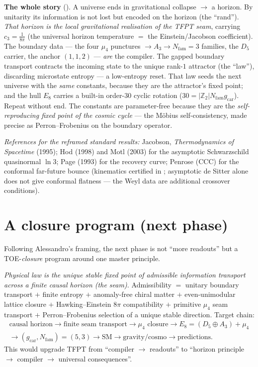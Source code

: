 \documentclass[11pt,a4paper]{article}
\newcommand{\cthree}{c_3}
\newcommand{\gcar}{g_{\mathrm{car}}}
\newcommand{\Nfam}{N_{\mathrm{fam}}}
\newcommand{\Z}{\mathbb Z}
\begin{document}
\par\smallskip\noindent\textbf{The whole story} (\mC).
A universe ends in gravitational collapse $\to$ a horizon. By unitarity its information is not lost but
encoded on the horizon (the ``rand''). \emph{That horizon is the local gravitational realisation of the
TFPT seam}, carrying $\cthree=\tfrac1{8\pi}$ (the universal horizon temperature $=$ the Einstein/Jacobson
coefficient). The boundary data --- the four
$\mu_4$ punctures $\to A_3\to\Nfam{=}3$ families, the $D_5$ carrier, the anchor $(1,1,2)$ --- \emph{are} the
compiler. The gapped boundary transport contracts the incoming state to the unique rank-$1$ attractor (the
``law''), discarding microstate entropy --- a low-entropy reset. That law seeds the next universe with the
\emph{same} constants, because they are the attractor's fixed point; and the hull $E_8$ carries a built-in
order-$30$ cyclic rotation ($30=|\Z_2|\Nfam\gcar$). Repeat without end. The constants are parameter-free
because they are the \emph{self-reproducing fixed point of the cosmic cycle} --- the M\"obius
self-consistency, made precise as Perron--Frobenius on the boundary operator.

\noindent\emph{References for the reframed standard results:} Jacobson, \textit{Thermodynamics of Spacetime}
(1995); Hod (1998) and Motl (2003) for the asymptotic Schwarzschild quasinormal $\ln3$; Page (1993) for the
recovery curve; Penrose (CCC) for the conformal far-future bounce (kinematics certified in ; asymptotic de Sitter alone does not give conformal flatness --- the Weyl data are additional crossover conditions).

\section{A closure program (next phase) \mO}\label{sec:program}
Following Alessandro's framing, the next phase is not ``more readouts'' but a TOE-\emph{closure} program
around one master principle.

\begin{keybox}
\emph{Physical law is the unique stable fixed point of admissible information transport across a finite
causal horizon (the seam).} Admissibility $=$ unitary boundary transport $+$ finite entropy $+$ anomaly-free
chiral matter $+$ even-unimodular lattice closure $+$ Hawking--Einstein $8\pi$ compatibility $+$ primitive
$\mu_4$ seam transport $+$ Perron--Frobenius selection of a unique stable direction. Target chain:
\[
  \begin{gathered}
  \text{causal horizon}\to\text{finite seam transport}\to\mu_4\text{ closure}\to E_8{=}(D_5{\oplus}A_3){+}\mu_4\\[2pt]
  \to(\gcar,\Nfam){=}(5,3)\to\text{SM}\to\text{gravity/cosmo}\to\text{predictions}.
  \end{gathered}
\]
This would upgrade TFPT from ``compiler $\to$ readouts'' to ``horizon principle $\to$ compiler $\to$ universal
consequences''.
\end{keybox}
\end{document}
